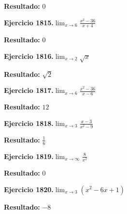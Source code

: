 \documentclass[10pt,a4paper]{article}
\begin{document}
\begin{solbox}
\textbf{Resultado:} \(\displaystyle 0\)
\end{solbox}

\begin{ejbox}
\textbf{Ejercicio 1815.}\quad $\lim_{x\to 6} \frac{x^2-36}{x+4}$
\end{ejbox}

\begin{solbox}
\textbf{Resultado:} \(\displaystyle 0\)
\end{solbox}

\newpage
\begin{ejbox}
\textbf{Ejercicio 1816.}\quad $\lim_{x\to 2} \sqrt{x}$
\end{ejbox}

\begin{solbox}
\textbf{Resultado:} \(\displaystyle \sqrt{2}\)
\end{solbox}

\begin{ejbox}
\textbf{Ejercicio 1817.}\quad $\lim_{x\to 6} \frac{x^2-36}{x-6}$
\end{ejbox}

\begin{solbox}
\textbf{Resultado:} \(\displaystyle 12\)
\end{solbox}

\begin{ejbox}
\textbf{Ejercicio 1818.}\quad $\lim_{x\to 3} \frac{x-3}{x^2-9}$
\end{ejbox}

\begin{solbox}
\textbf{Resultado:} \(\displaystyle \frac{1}{6}\)
\end{solbox}

\newpage
\begin{ejbox}
\textbf{Ejercicio 1819.}\quad $\lim_{x\to \infty} \frac{8}{x^2}$
\end{ejbox}

\begin{solbox}
\textbf{Resultado:} \(\displaystyle 0\)
\end{solbox}

\begin{ejbox}
\textbf{Ejercicio 1820.}\quad $\lim_{x\to 3} (x^2 -6x +1)$
\end{ejbox}

\begin{solbox}
\textbf{Resultado:} \(\displaystyle -8\)
\end{solbox}
\end{document}

